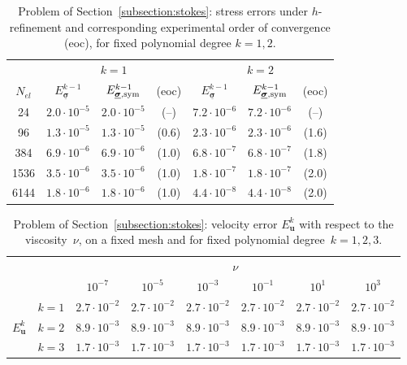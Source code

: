 \documentclass[a4paper,twoside,10pt]{article}
\theoremstyle{plain}
\theoremstyle{remark}
\theoremstyle{definition}
\numberwithin{equation}{section}
\numberwithin{figure}{section}
\newcommand{\sigmabf}{\underline{\boldsymbol{\sigma}}}
\newcommand{\ubf}{\mathbf{u}}
\newcommand{\Ekmosigmasym}{E_{\sigmabf,\rm{sym}}^{k-1}}
\newcommand{\Ekmosigma}{E_{\sigmabf}^{k-1}}
\newcommand{\Eku}{E_{\ubf}^{k}}
\newcommand{\Nel}{N_{el}}
\begin{document}
\begin{table}[htbp]
\centering
\begin{tabular}{c|ccc|ccc}
\toprule
& \multicolumn{3}{c|}{$k=1$}
& \multicolumn{3}{c}{$k=2$} \\
$\Nel$
& $\Ekmosigma$
& $\Ekmosigmasym$
& (eoc)
& $\Ekmosigma$
& $\Ekmosigmasym$
& (eoc) \\
\midrule
24
& $2.0\cdot10^{-5}$ & $2.0\cdot10^{-5}$ & (--)
& $7.2\cdot10^{-6}$ & $7.2\cdot10^{-6}$ & (--) \\

96
& $1.3\cdot10^{-5}$ & $1.3\cdot10^{-5}$ & (0.6)
& $2.3\cdot10^{-6}$ & $2.3\cdot10^{-6}$ & (1.6) \\

384
& $6.9\cdot10^{-6}$ & $6.9\cdot10^{-6}$ & (1.0)
& $6.8\cdot10^{-7}$ & $6.8\cdot10^{-7}$ & (1.8) \\

1536
& $3.5\cdot10^{-6}$ & $3.5\cdot10^{-6}$ & (1.0)
& $1.8\cdot10^{-7}$ & $1.8\cdot10^{-7}$ & (2.0) \\

6144
& $1.8\cdot10^{-6}$ & $1.8\cdot10^{-6}$ & (1.0)
& $4.4\cdot10^{-8}$ & $4.4\cdot10^{-8}$ & (2.0) \\
\bottomrule
\end{tabular}
\caption{\footnotesize Problem of Section~\ref{subsection:stokes}:
        stress errors under $h$-refinement and
        corresponding experimental order of convergence (eoc),
        for fixed polynomial degree $k=1,2$.}
\label{tab:errors-sigma}
\end{table}


\begin{table}[htbp]
\centering
\begin{tabular}{c c c c c c c c}
\toprule
& & \multicolumn{6}{c}{$\nu$} \\
& & $10^{-7}$ & $10^{-5}$ & $10^{-3}$ & $10^{-1}$ & $10^1$ & $10^3$  \\
\midrule 
\multirow{3}{*}{$\Eku$}
& \multicolumn{1}{c|}{$k = 1$}
& $2.7\cdot 10^{-2}$ & $2.7\cdot 10^{-2}$ & $2.7\cdot 10^{-2}$ & $2.7\cdot 10^{-2}$ & $2.7\cdot 10^{-2}$ & $2.7\cdot 10^{-2}$\\
& \multicolumn{1}{c|}{$k = 2$}
& $8.9\cdot 10^{-3}$ & $8.9\cdot 10^{-3}$ & $8.9\cdot 10^{-3}$ & $8.9\cdot 10^{-3}$ & $8.9\cdot 10^{-3}$ & $8.9\cdot 10^{-3}$\\
& \multicolumn{1}{c|}{$k = 3$}
& $1.7\cdot 10^{-3}$ & $1.7\cdot 10^{-3}$ & $1.7\cdot 10^{-3}$ & $1.7\cdot 10^{-3}$ & $1.7\cdot 10^{-3}$ & $1.7\cdot 10^{-3}$\\
\bottomrule
\end{tabular}
\caption{\footnotesize Problem of Section~\ref{subsection:stokes}:
                        velocity error $\Eku$ with respect to the viscosity~$\nu$,
                        on a fixed mesh and for fixed polynomial degree~$k=1,2,3$.}
\label{tab:nu}
\end{table}
 
\end{document}
